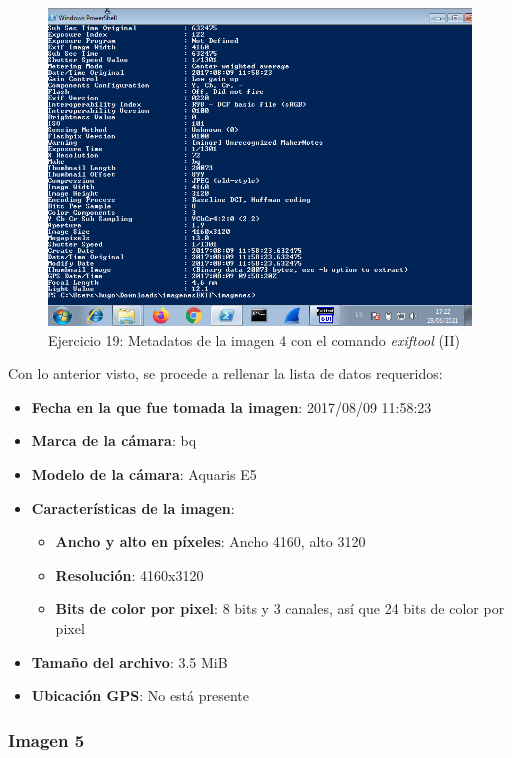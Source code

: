 \documentclass[11pt]{article}
\begin{document}
\begin{figure}[H]
    \caption{Ejercicio 19: Metadatos de la imagen 4 con el comando \textit{exiftool} (II)}
    \centering
    \includegraphics[scale=0.7]{p03/e19-10.png}
\end{figure}

Con lo anterior visto, se procede a rellenar la lista de datos requeridos:

\begin{itemize}
    \item \textbf{Fecha en la que fue tomada la imagen}: 2017/08/09 11:58:23 
    \item \textbf{Marca de la cámara}: bq
    \item \textbf{Modelo de la cámara}: Aquaris E5
    \item \textbf{Características de la imagen}:
        \begin{itemize}
            \item \textbf{Ancho y alto en píxeles}: Ancho 4160, alto 3120
            \item \textbf{Resolución}: 4160x3120
            \item \textbf{Bits de color por pixel}: 8 bits y 3 canales, así que 24 bits de color por pixel
        \end{itemize}
    \item \textbf{Tamaño del archivo}: 3.5 MiB
    \item \textbf{Ubicación GPS}: No está presente 
\end{itemize}

\subsubsection{Imagen 5}
\end{document}
